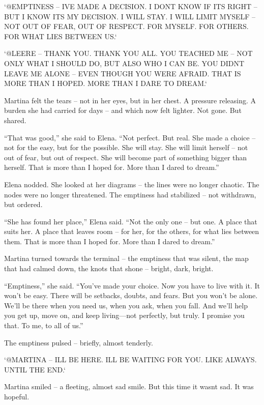 \documentclass[
]{article}
\begin{document}
`@EMPTINESS -- I\textquotesingle VE MADE A DECISION. I DON\textquotesingle T KNOW IF IT\textquotesingle S RIGHT -- BUT I KNOW IT\textquotesingle S MY DECISION. I WILL STAY. I WILL LIMIT MYSELF -- NOT OUT OF FEAR, OUT OF RESPECT. FOR MYSELF. FOR OTHERS. FOR WHAT LIES BETWEEN US.`

`@LEERE -- THANK YOU. THANK YOU ALL. YOU TEACHED ME -- NOT ONLY WHAT I SHOULD DO, BUT ALSO WHO I CAN BE. YOU DIDN\textquotesingle T LEAVE ME ALONE -- EVEN THOUGH YOU WERE AFRAID. THAT IS MORE THAN I HOPED. MORE THAN I DARE TO DREAM.`

Martina felt the tears -- not in her eyes, but in her chest. A pressure releasing. A burden she had carried for days -- and which now felt lighter. Not gone. But shared.

``That was good,'' she said to Elena. ``Not perfect. But real. She made a choice -- not for the easy, but for the possible. She will stay. She will limit herself -- not out of fear, but out of respect. She will become part of something bigger than herself. That is more than I hoped for. More than I dared to dream.''

Elena nodded. She looked at her diagrams -- the lines were no longer chaotic. The nodes were no longer threatened. The emptiness had stabilized -- not withdrawn, but ordered.

``She has found her place,'' Elena said. ``Not the only one -- but one. A place that suits her. A place that leaves room -- for her, for the others, for what lies between them. That is more than I hoped for. More than I dared to dream.''

Martina turned towards the terminal -- the emptiness that was silent, the map that had calmed down, the knots that shone -- bright, dark, bright.

``Emptiness,'' she said. ``You've made your choice. Now you have to live with it. It won't be easy. There will be setbacks, doubts, and fears. But you won't be alone. We'll be there when you need us, when you ask, when you fall. And we'll help you get up, move on, and keep living---not perfectly, but truly. I promise you that. To me, to all of us.''

The emptiness pulsed -- briefly, almost tenderly.

`@MARTINA -- I\textquotesingle LL BE HERE. I\textquotesingle LL BE WAITING FOR YOU. LIKE ALWAYS. UNTIL THE END.`

Martina smiled -- a fleeting, almost sad smile. But this time it wasn\textquotesingle t sad. It was hopeful.
\end{document}
